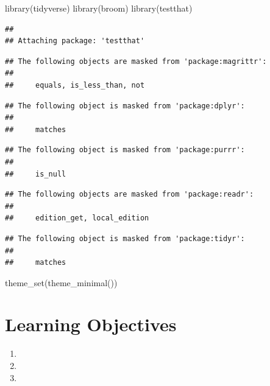 \documentclass[
]{book}
\newenvironment{Shaded}{\begin{snugshade}}{\end{snugshade}}
\newcommand{\FunctionTok}[1]{\textcolor[rgb]{0.00,0.00,0.00}{#1}}
\newcommand{\NormalTok}[1]{#1}
\providecommand{\tightlist}{%
  \setlength{\itemsep}{0pt}\setlength{\parskip}{0pt}}
\theoremstyle{definition}
\theoremstyle{definition}
\theoremstyle{definition}
\theoremstyle{definition}
\theoremstyle{remark}
\begin{document}
\begin{Shaded}
\begin{Highlighting}[]
\FunctionTok{library}\NormalTok{(tidyverse)}
\FunctionTok{library}\NormalTok{(broom)}
\FunctionTok{library}\NormalTok{(testthat)}
\end{Highlighting}
\end{Shaded}

\begin{verbatim}
## 
## Attaching package: 'testthat'
\end{verbatim}

\begin{verbatim}
## The following objects are masked from 'package:magrittr':
## 
##     equals, is_less_than, not
\end{verbatim}

\begin{verbatim}
## The following object is masked from 'package:dplyr':
## 
##     matches
\end{verbatim}

\begin{verbatim}
## The following object is masked from 'package:purrr':
## 
##     is_null
\end{verbatim}

\begin{verbatim}
## The following objects are masked from 'package:readr':
## 
##     edition_get, local_edition
\end{verbatim}

\begin{verbatim}
## The following object is masked from 'package:tidyr':
## 
##     matches
\end{verbatim}

\begin{Shaded}
\begin{Highlighting}[]
\FunctionTok{theme\_set}\NormalTok{(}\FunctionTok{theme\_minimal}\NormalTok{())}
\end{Highlighting}
\end{Shaded}

\hypertarget{learning-objectives-7}{%
\section{Learning Objectives}\label{learning-objectives-7}}

\begin{enumerate}
\def\labelenumi{\arabic{enumi}.}
\tightlist
\item
\item
\item
\end{enumerate}
\end{document}
